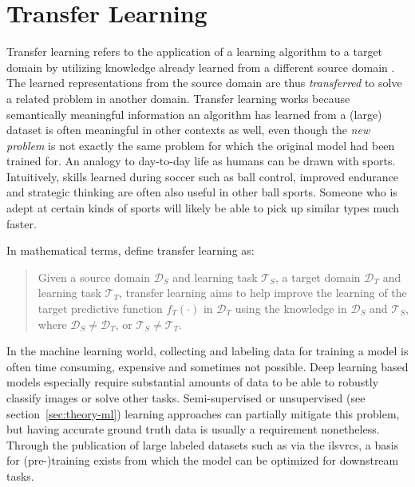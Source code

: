 \documentclass[final]{vutinfth} %
\begin{document}
\section{Transfer Learning}
\label{sec:background-transfer-learning}

Transfer learning refers to the application of a learning algorithm to
a target domain by utilizing knowledge already learned from a
different source domain \cite{zhuang2021}. The learned representations
from the source domain are thus \emph{transferred} to solve a related
problem in another domain. Transfer learning works because
semantically meaningful information an algorithm has learned from a
(large) dataset is often meaningful in other contexts as well, even
though the \emph{new problem} is not exactly the same problem for
which the original model had been trained for. An analogy to
day-to-day life as humans can be drawn with sports. Intuitively,
skills learned during soccer such as ball control, improved endurance
and strategic thinking are often also useful in other ball
sports. Someone who is adept at certain kinds of sports will likely be
able to pick up similar types much faster.

In mathematical terms, \textcite{pan2010} define transfer learning as:

\begin{quote}{\cite[p.1347]{pan2010}}
  Given a source domain $\mathcal{D}_{S}$ and learning task
  $\mathcal{T}_{S}$, a target domain $\mathcal{D}_{T}$ and learning task
  $\mathcal{T}_{T}$, transfer learning aims to help improve the learning of the
  target predictive function $f_{T}(\cdot)$ in $\mathcal{D}_{T}$ using the knowledge
  in $\mathcal{D}_{S}$ and $\mathcal{T}_{S}$, where $\mathcal{D}_{S}\neq\mathcal{D}_{T}$, or $\mathcal{T}_{S}\neq\mathcal{T}_{T}$.
\end{quote}

In the machine learning world, collecting and labeling data for
training a model is often time consuming, expensive and sometimes not
possible. Deep learning based models especially require substantial
amounts of data to be able to robustly classify images or solve other
tasks. Semi-supervised or unsupervised (see
section~\ref{sec:theory-ml}) learning approaches can partially
mitigate this problem, but having accurate ground truth data is
usually a requirement nonetheless. Through the publication of large
labeled datasets such as via the \glspl{ilsvrc}, a basis for
(pre-)training exists from which the model can be optimized for
downstream tasks.
\end{document}

